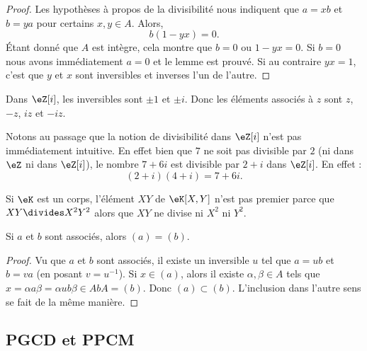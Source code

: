 \begin{proof}
	Les hypothèses à propos de la divisibilité nous indiquent que \( a=xb\) et \( b=ya\) pour certains \( x,y\in A\). Alors,
	\begin{equation}
		b(1-yx)=0.
	\end{equation}
	Étant donné que \( A\) est intègre, cela montre que \( b=0\) ou \( 1-yx=0\). Si \( b=0\) nous avons immédiatement \( a=0\) et le lemme est prouvé. Si au contraire \( yx=1\), c'est que \( y\) et \( x\) sont inversibles et inverses l'un de l'autre.
\end{proof}


\begin{example}
	Dans \( \eZ[i]\), les inversibles sont \( \pm 1\) et \( \pm i\). Donc les éléments associés à \( z\) sont \( z\), \( -z\), \( iz\) et \( -iz\).

	Notons au passage que la notion de divisibilité dans \( \eZ[i]\) n'est pas immédiatement intuitive. En effet bien que \( 7\) ne soit pas divisible par \( 2\) (ni dans \( \eZ\) ni dans \( \eZ[i]\)), le nombre \( 7+6i\) est divisible par \( 2+i\) dans \( \eZ[i]\). En effet :
	\begin{equation}
		(2+i)(4+i)=7+6i.
	\end{equation}
\end{example}

\begin{example}
	Si \( \eK\) est un corps, l'élément \( XY\) de \( \eK[X,Y]\) n'est pas premier parce que \( XY\divides X^2Y^2\) alors que \( XY\) ne divise ni \( X^2\) ni \( Y^2\).
\end{example}


\begin{lemma}	\label{LEMooLXPSooYjULCJ}
	Si \( a\) et \( b\) sont associés, alors \( (a)=(b)\).
\end{lemma}

\begin{proof}
	Vu que \( a\) et \( b\) sont associés, il existe un inversible \( u\) tel que \( a=ub\) et \( b=va\) (en posant \( v=u^{-1}\)). Si \( x\in(a)\), alors il existe \( \alpha,\beta\in A\) tels que \( x=\alpha a\beta=\alpha ub\beta\in AbA=(b)\). Donc \( (a)\subset (b)\). L'inclusion dans l'autre sens se fait de la même manière.
\end{proof}

\subsection{PGCD et PPCM}

